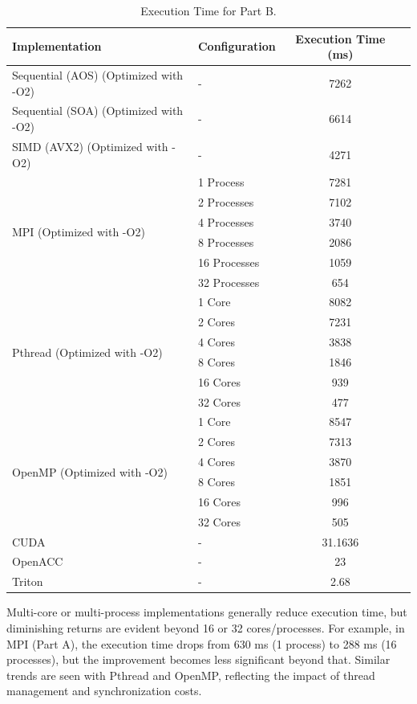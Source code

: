 \documentclass[12pt,a4paper]{report}
\begin{document}
\begin{table}[htbp]
    \centering
    \footnotesize
    \renewcommand{\arraystretch}{0.8}%
    \begin{tabular}{llcc}
        \toprule
        \textbf{Implementation} & \textbf{Configuration} & \textbf{Execution Time (ms)} \\
        \midrule
        Sequential (AOS) (Optimized with -O2) & - & 7262 \\
        Sequential (SOA) (Optimized with -O2) & - & 6614 \\
        SIMD (AVX2) (Optimized with -O2) & - & 4271 \\
        \midrule
        \multirow{6}{*}{MPI (Optimized with -O2)} & 1 Process & 7281 \\
        & 2 Processes & 7102 \\
        & 4 Processes & 3740 \\
        & 8 Processes & 2086 \\
        & 16 Processes & 1059 \\
        & 32 Processes & 654 \\
        \midrule
        \multirow{6}{*}{Pthread (Optimized with -O2)} & 1 Core & 8082 \\
        & 2 Cores & 7231 \\
        & 4 Cores & 3838 \\
        & 8 Cores & 1846 \\
        & 16 Cores & 939 \\
        & 32 Cores & 477 \\
        \midrule
        \multirow{6}{*}{OpenMP (Optimized with -O2)} & 1 Core & 8547 \\
        & 2 Cores & 7313 \\
        & 4 Cores & 3870 \\
        & 8 Cores & 1851 \\
        & 16 Cores & 996 \\
        & 32 Cores & 505 \\
        \midrule
        CUDA & - & 31.1636 \\
        OpenACC & - & 23 \\
        Triton & - & 2.68 \\
        \bottomrule
    \end{tabular}%
    \caption{Execution Time for Part B.}
    \label{tab:execution_times_part_b}
\end{table}

Multi-core or multi-process implementations generally reduce execution time, but diminishing returns are evident beyond 16 or 32 cores/processes. For example, in MPI (Part A), the execution time drops from 630 ms (1 process) to 288 ms (16 processes), but the improvement becomes less significant beyond that. Similar trends are seen with Pthread and OpenMP, reflecting the impact of thread management and synchronization costs.
\end{document}
